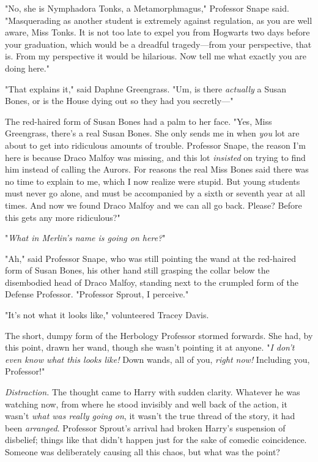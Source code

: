 "No, she is Nymphadora Tonks, a Metamorphmagus," Professor Snape said. 
"Masquerading as another student is extremely against regulation, as you are 
well aware, Miss Tonks. It is not too late to expel you from Hogwarts two days 
before your graduation, which would be a dreadful tragedy---from your 
perspective, that is. From my perspective it would be hilarious. Now tell me 
what exactly you are doing here."

"That explains it," said Daphne Greengrass. "Um, is there \emph{actually} a 
Susan Bones, or is the House dying out so they had you secretly---"

The red-haired form of Susan Bones had a palm to her face. "Yes, Miss 
Greengrass, there's a real Susan Bones. She only sends me in when \emph{you} 
lot are about to get into ridiculous amounts of trouble. Professor Snape, the 
reason I'm here is because Draco Malfoy was missing, and this lot 
\emph{insisted} on trying to find him instead of calling the Aurors. For 
reasons the real Miss Bones said there was no time to explain to me, which I 
now realize were stupid. But young students must never go alone, and must be 
accompanied by a sixth or seventh year at all times. And now we found Draco 
Malfoy and we can all go back. Please? Before this gets any more ridiculous?"

"\emph{What in Merlin's name is going on here?}"

"Ah," said Professor Snape, who was still pointing the wand at the red-haired 
form of Susan Bones, his other hand still grasping the collar below the 
disembodied head of Draco Malfoy, standing next to the crumpled form of the 
Defense Professor. "Professor Sprout, I perceive."

"It's not what it looks like," volunteered Tracey Davis.

The short, dumpy form of the Herbology Professor stormed forwards. She had, by 
this point, drawn her wand, though she wasn't pointing it at anyone. "\emph{I 
don't even know what this looks like!} Down wands, all of you, \emph{right 
now!} Including you, Professor!"

\emph{Distraction.} The thought came to Harry with sudden clarity. Whatever he 
was watching now, from where he stood invisibly and well back of the action, it 
wasn't \emph{what was really going on}, it wasn't the true thread of the story, 
it had been \emph{arranged}. Professor Sprout's arrival had broken Harry's 
suspension of disbelief; things like that didn't happen just for the sake of 
comedic coincidence. Someone was deliberately causing all this chaos, but what 
was the point?

